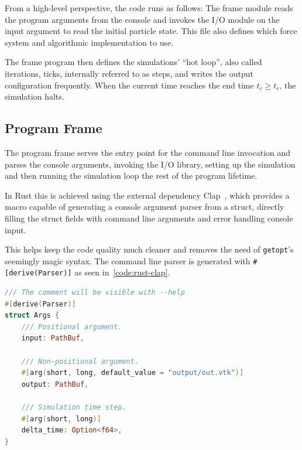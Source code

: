 \documentclass[11pt,
               a4paper,
               bibtotoc,
               idxtotoc,
               headsepline,
               footsepline,
               footexclude,
               BCOR12mm,
               DIV13,
               openany,   %
               ]
               {scrbook}
\begin{document}
From a high-level perspective, the code runs as follows: The frame module reads the program arguments from the console and invokes the I/O module on the input argument to read the initial particle state. This file also defines which force system and algorithmic implementation to use.

The frame program then defines the simulations' ``hot loop'', also called iterations, ticks, internally referred to as steps, and writes the output configuration frequently. When the current time reaches the end time $t_c \geq t_e$, the simulation halts.

\subsection{Program Frame}

The program frame serves the entry point for the command line invocation and parses the console arguments, invoking the I/O library, setting up the simulation and then running the simulation loop the rest of the program lifetime.


In Rust this is achieved using the external dependency Clap~\cite{rust-crates-clap}, which provides a macro capable of generating a console argument parser from a struct, directly filling the struct fields with command line arguments and error handling console input. 

This helps keep the code quality much cleaner and removes the need of \texttt{getopt}'s seemingly magic syntax. The command line parser is generated with \texttt{\#[derive(Parser)]} as seen in~\autoref{code:rust-clap}.

\vspace{0.5em}
\begin{lstlisting}[style=eclipse-rust, language=Rust, basicstyle=\ttfamily\small, caption=An example of using clap in Rust, label=code:rust-clap]
/// The comment will be visible with --help
#[derive(Parser)]
struct Args {
    /// Positional argument.
    input: PathBuf,

    /// Non-positional argument.
    #[arg(short, long, default_value = "output/out.vtk")]
    output: PathBuf,

    /// Simulation time step.
    #[arg(short, long)]
    delta_time: Option<f64>,
}
\end{lstlisting}
\end{document}
